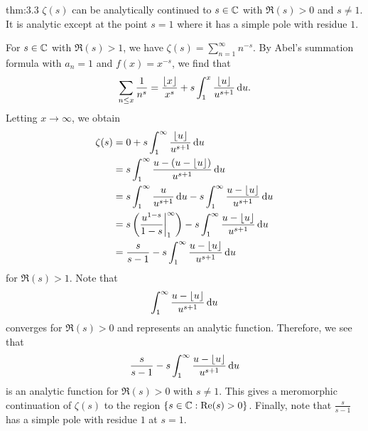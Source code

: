 \begin{theo}{thm:3.3}
$\zeta(s)$ can be analytically continued to $s \in \mathbb{C}$ with 
$\Re(s) > 0$ and $s \neq 1$. It is analytic except 
at the point $s = 1$ where it has a simple pole with residue
$1$. 
\end{theo}
\begin{pf}
For $s \in \mathbb{C}$ with $\Re(s) > 1$, we have 
$\zeta(s) = \sum_{n=1}^\infty n^{-s}$. By Abel's 
summation formula with $a_n = 1$ and $f(x) = x^{-s}$, 
we find that 
\[ \sum_{n\leq x} \frac{1}{n^s} = \frac{\lfloor x\rfloor}{x^s}
+ s\int_1^x \frac{\lfloor u\rfloor}{u^{s+1}}\,\mathrm{d} u. \]
Letting $x \to \infty$, we obtain 
\begin{align*}
    \zeta(s) &= 0 + s\int_1^\infty \frac{\lfloor u\rfloor}{u^{s+1}}\,\mathrm{d} u \\
    &= s \int_1^\infty \frac{u - (u - \lfloor u\rfloor)}{u^{s+1}}\,\mathrm{d} u \\
    &= s \int_1^\infty \frac{u}{u^{s+1}}\,\mathrm{d} u - 
    s \int_1^\infty \frac{u - \lfloor u\rfloor}{u^{s+1}}\,\mathrm{d} u \\
    &= s \left( \frac{u^{1-s}}{1-s} \biggr\rvert_1^\infty 
    \right)
    - s \int_1^\infty \frac{u - \lfloor u\rfloor}{u^{s+1}}\,\mathrm{d} u \\
    &= \frac{s}{s-1} - s \int_1^\infty \frac{u - \lfloor u\rfloor}{u^{s+1}}\,\mathrm{d} u
\end{align*}
for $\Re(s) > 1$. Note that 
\[ \int_1^\infty \frac{u - \lfloor u\rfloor}{u^{s+1}}\,\mathrm{d} u \]
converges for $\Re(s) > 0$ and represents an analytic function. Therefore, we see that 
\[ \frac{s}{s-1} - s \int_1^\infty \frac{u - \lfloor u\rfloor}{u^{s+1}}\,\mathrm{d} u \] 
is an analytic function for $\Re(s) > 0$ with $s \neq 1$. 
This gives a meromorphic continuation of $\zeta(s)$ 
to the region $\{s \in \mathbb{C} : {\rm Re}(s) > 0\}$. Finally, note that 
$\frac{s}{s-1}$ has a simple pole with residue $1$ at $s = 1$.
\end{pf}

